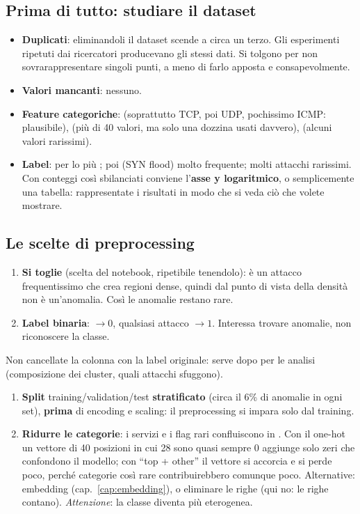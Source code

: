 \subsection{Prima di tutto: studiare il dataset}
\begin{itemize}
  \item \textbf{Duplicati}: eliminandoli il dataset scende a circa un terzo. Gli esperimenti ripetuti dai ricercatori producevano
        gli stessi dati. Si tolgono per non sovrarappresentare singoli punti, a meno di farlo apposta e consapevolmente.
  \item \textbf{Valori mancanti}: nessuno.
  \item \textbf{Feature categoriche}:  (soprattutto TCP, poi UDP, pochissimo ICMP: plausibile),
         (più di 40 valori, ma solo una dozzina usati davvero),  (alcuni valori rarissimi).
  \item \textbf{Label}: per lo più ; poi  (SYN flood) molto frequente; molti attacchi rarissimi.
        Con conteggi così sbilanciati conviene l'\textbf{asse y logaritmico}, o semplicemente una tabella: rappresentate i risultati in
        modo che si veda ciò che volete mostrare.
\end{itemize}

\subsection{Le scelte di preprocessing}
\begin{enumerate}
  \item \textbf{Si toglie } (scelta del notebook, ripetibile tenendolo): è un attacco frequentissimo che crea regioni
        dense, quindi dal punto di vista della densità non è un'anomalia. Così le anomalie restano rare.
  \item \textbf{Label binaria}:  $\to 0$, qualsiasi attacco $\to 1$. Interessa trovare anomalie, non riconoscere la classe.
\end{enumerate}
\begin{esame}
Non cancellate la colonna con la label originale: serve dopo per le analisi (composizione dei cluster, quali attacchi sfuggono).
\end{esame}
\begin{enumerate}[resume]
  \item \textbf{Split} training/validation/test \textbf{stratificato} (circa il 6\% di anomalie in ogni set), \textbf{prima} di encoding
        e scaling: il preprocessing si impara solo dal training.
  \item \textbf{Ridurre le categorie}: i servizi e i flag rari confluiscono in . Con il one-hot un vettore di 40 posizioni
        in cui 28 sono quasi sempre 0 aggiunge solo zeri che confondono il modello; con ``top + other'' il vettore si accorcia e si perde
        poco, perché categorie così rare contribuirebbero comunque poco. Alternative: embedding (cap.~\ref{cap:embedding}), o eliminare le
        righe (qui no: le righe contano). \emph{Attenzione}: la classe  diventa più eterogenea.
\end{enumerate}

